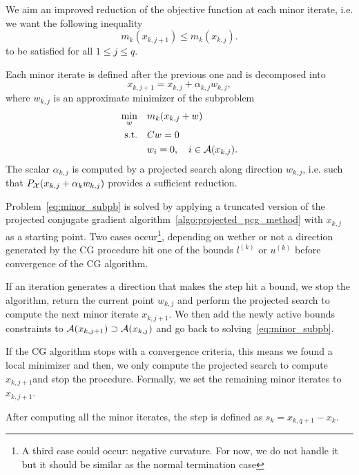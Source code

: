 \documentclass[10pt]{article}
\numberwithin{equation}{section}
\begin{document}
	We aim an improved reduction of the objective function at each minor iterate, i.e. we want the following inequality
	\begin{equation}
		m_k(x_{k,j+1}) \le m_k(x_{k,j}).
	\end{equation}
	to be satisfied for all $1\le j \le q$.
	
	Each minor iterate is defined after the previous one and is decomposed into 
	\[x_{k,j+1}=x_{k,j}+\alpha_{k,j}w_{k,j},\]
	where $w_{k,j}$ is an approximate minimizer of the subproblem
	\begin{equation}\label{eq:minor_subpb}
		\begin{aligned}
			\min_w \quad & m_k(x_{k,j}+w) \\
			\text{s.t.} \quad & Cw=0 \\
			& w_i = 0,\quad i \in {\mathcal{A}}(x_{k,j}).
		\end{aligned}
	\end{equation}
	The scalar $\alpha_{k,j}$ is computed by a projected search along direction $w_{k,j}$, i.e. such that $P_{\mathcal{X}}(x_{k,j}+\alpha_kw_{k,j})$ provides a sufficient reduction.
	
	Problem~\eqref{eq:minor_subpb} is solved by applying a truncated version of the projected conjugate gradient algorithm~\ref{algo:projected_pcg_method} with $x_{k,j}$ as a starting point. Two cases occur\footnote{A third case could occur: negative curvature. For now, we do not handle it but it should be similar as the normal termination case}, depending on wether or not a direction generated by the CG procedure hit one of the bounds $l^{(k)}$ or $u^{(k)}$ before convergence of the CG algorithm.
	
	If an iteration generates a direction that makes the step hit a bound, we stop the algorithm, return the current point $w_{k,j}$ and perform the projected search to compute the next minor iterate $x_{k,j+1}$. We then add the newly active bounds constraints to ${\mathcal{A}}(x_{k,j+1}) \supset {\mathcal{A}}(x_{k,j})$ and go back to solving~\eqref{eq:minor_subpb}.
	
	If the CG algorithm stops with a convergence criteria, this means we found a local minimizer and then, we only compute the projected search to compute $x_{k,j+1}$and stop the procedure. Formally, we set the remaining minor iterates to $x_{k,j+1}$.
	
	After computing all the minor iterates, the step is defined as $s_k = x_{k,q+1}-x_k$.
	
	\clearpage
	
	
	
\end{document}
